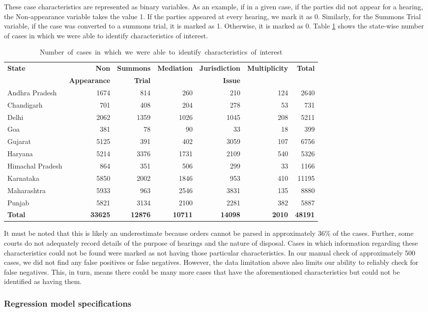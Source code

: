 These case characteristics are represented as binary variables. As an example, if in a given case, if the parties did not appear for a hearing, the Non-appearance variable takes the value 1. If the parties appeared at every hearing, we mark it as 0. Similarly, for the Summons Trial variable, if the case was converted to a summons trial, it is marked as 1. Otherwise, it is marked as 0. Table \ref{tab:case_chars} shows the state-wise number of cases in which we were able to identify characteristics of interest.

{\footnotesize \centering
 \begin{longtable}{@{}lrrrrrr@{}}
 \caption{\mbox{Number of cases in which we were able to identify
 characteristics of interest}}
 \label{tab:case_chars}\\
 \toprule
 \textbf{State} & \textbf{Non} & \textbf{Summons} & \textbf{Mediation} & \textbf{Jurisdiction} & \textbf{Multiplicity} & \textbf{Total} \\
 & \textbf{Appearance} & \textbf{Trial} & & \textbf{Issue} & & \\
 \midrule
 \endhead
 Andhra Pradesh & 1674 & 814 & 260 & 210 & 124 & 2640 \\
 Chandigarh & 701 & 408 & 204 & 278 & 53 & 731 \\
 Delhi & 2062 & 1359 & 1026 & 1045 & 208 & 5211 \\
 Goa & 381 & 78 & 90 & 33 & 18 & 399 \\
 Gujarat & 5125 & 391 & 402 & 3059 & 107 & 6756 \\
 Haryana & 5214 & 3376 & 1731 & 2109 & 540 & 5326 \\
 Himachal Pradesh & 864 & 351 & 506 & 299 & 33 & 1166 \\
 Karnataka & 5850 & 2002 & 1846 & 953 & 410 & 11195 \\
 Maharashtra & 5933 & 963 & 2546 & 3831 & 135 & 8880 \\
 Punjab & 5821 & 3134 & 2100 & 2281 & 382 & 5887 \\
 \midrule
 \textbf{Total} & \textbf{33625} & \textbf{12876} & \textbf{10711} &
 \textbf{14098} & \textbf{2010} & \textbf{48191}\\\bottomrule
\end{longtable}
}

It must be noted that this is likely an underestimate because orders cannot be parsed in approximately 36\% of the cases. Further, some courts do not adequately record details of the purpose of hearings and the nature of disposal. Cases in which information regarding these characteristics could not be found were marked as not having those particular characteristics. In our manual check of approximately 500 cases, we did not find any false positives or false negatives. However, the data limitation above also limits our ability to reliably check for false negatives. This, in turn, means there could be many more cases that have the aforementioned characteristics but could not be identified as having them.

\subsubsection{Regression model specifications} \label{sec:model-selection}


